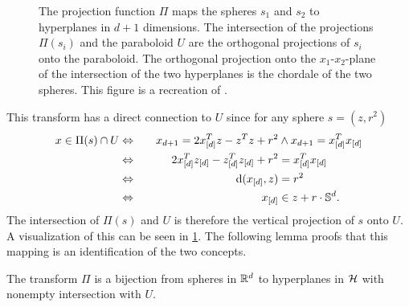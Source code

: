 \begin{figure}[tb]
    \caption{The projection function $\Pi$ maps the spheres $s_1$ and $s_2$ to hyperplanes in $d+1$ dimensions.
    The intersection of the projections $\Pi(s_i)$ and the paraboloid $U$ are the orthogonal projections of $s_i$ onto the paraboloid.
    The orthogonal projection onto the $x_1$-$x_2$-plane of the intersection of the two hyperplanes is the chordale of the two spheres.
    This figure is a recreation of .}
    \label{fig:projection}
\end{figure}
This transform has a direct connection to $U$ since for any sphere $s = (z, r^2)$
\begin{alignat}{2}
    x \in \Pi(s) \cap U &\Leftrightarrow\quad& x_{d+1} = 2x_{[d]}^Tz - z^Tz + r^2 &\wedge x_{d+1} = x_{[d]}^Tx_{[d]}\\
    &\Leftrightarrow\quad&2x_{[d]}^Tz_{[d]} - z_{[d]}^Tz_{[d]} + r^2 &= x_{[d]}^Tx_{[d]}\\
    &\Leftrightarrow\quad& \operatorname{d}(x_{[d]}, z) &= r^2\\
    &\Leftrightarrow\quad& x_{[d]} &\in z + r \cdot \mathbb{S}^d.
\end{alignat}
The intersection of $\Pi(s)$ and $U$ is therefore the vertical projection of $s$ onto $U$.
A visualization of this can be seen in \cref{fig:projection}.
The following lemma proofs that this mapping is an identification of the two concepts.
\begin{lemma}
    \label{lem:pibijection}
    The transform $\Pi$ is a bijection from spheres in $\mathbb{R}^d$ to hyperplanes in $\mathcal{H}$ with nonempty intersection with $U$.
\end{lemma}
